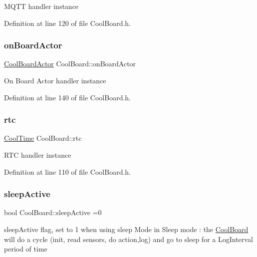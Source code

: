 M\+Q\+TT handler instance 

Definition at line 120 of file Cool\+Board.\+h.

\mbox{\label{class_cool_board_a4ac693895c21025b8808653f2a4316e6}} 
\subsubsection{\texorpdfstring{on\+Board\+Actor}{onBoardActor}}
{\footnotesize\ttfamily \hyperlink{class_cool_board_actor}{Cool\+Board\+Actor} Cool\+Board\+::on\+Board\+Actor\hspace{0.3cm}{\ttfamily [private]}}

On Board Actor handler instance 

Definition at line 140 of file Cool\+Board.\+h.

\mbox{\label{class_cool_board_a50d2a6716879d64a85f3c6b44ad63275}} 
\subsubsection{\texorpdfstring{rtc}{rtc}}
{\footnotesize\ttfamily \hyperlink{class_cool_time}{Cool\+Time} Cool\+Board\+::rtc\hspace{0.3cm}{\ttfamily [private]}}

R\+TC handler instance 

Definition at line 110 of file Cool\+Board.\+h.

\mbox{\label{class_cool_board_a0a51b2287139f66c738101fb53139230}} 
\subsubsection{\texorpdfstring{sleep\+Active}{sleepActive}}
{\footnotesize\ttfamily bool Cool\+Board\+::sleep\+Active =0\hspace{0.3cm}{\ttfamily [private]}}

sleep\+Active flag, set to 1 when using sleep Mode in Sleep mode \+: the \hyperlink{class_cool_board}{Cool\+Board} will do a cycle (init, read sensors, do action,log) and go to sleep for a Log\+Interval period of time 

